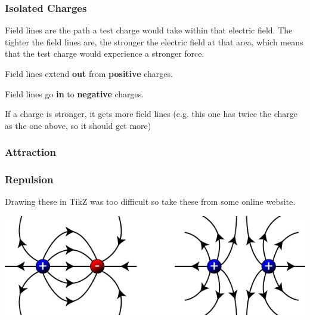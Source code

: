 \documentclass[../main.tex]{subfiles}
\begin{document}
		\subsubsection{Isolated Charges}
		Field lines are the path a test charge would take within that electric field. The tighter the field lines are, the stronger the electric field at that area, which means that the test charge would experience a stronger force.
		
		Field lines extend \textbf{out} from \textbf{positive} charges.
		\begin{center}
		\end{center}
		Field lines go \textbf{in} to \textbf{negative} charges.
		\begin{center}
		\end{center}
		
		If a charge is stronger, it gets more field lines (e.g. this one has twice the charge as the one above, so it should get more)
		\begin{center}
		\end{center}
		
		\subsubsection{Attraction}
		\subsubsection{Repulsion}
		Drawing these in TikZ was too difficult so take these from some online website.
		\begin{center}
			\includegraphics[width=\linewidth]{graphics/electrostaticsFieldLines}
		\end{center}
	
\end{document}
